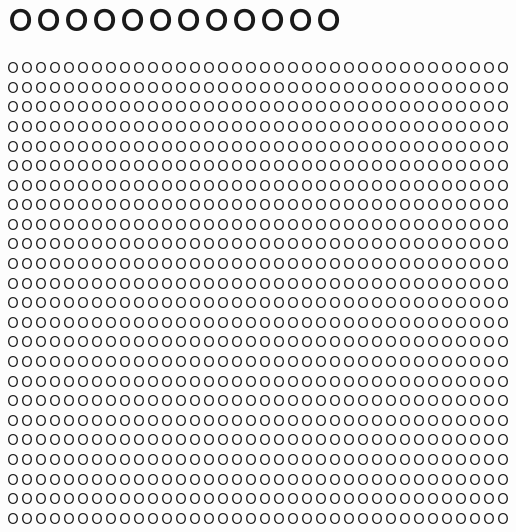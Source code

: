 \documentclass[10pt,twocolumn]{jarticle}
\begin{document}
\section{ＯＯＯＯＯＯＯＯＯＯＯＯ}
ＯＯＯＯＯＯＯＯＯＯＯＯＯＯＯＯＯＯＯＯＯＯＯＯＯＯＯＯＯＯＯＯＯＯＯＯＯＯＯＯＯＯＯＯＯＯＯＯＯＯＯＯＯＯＯＯＯＯＯＯＯＯＯＯＯＯＯＯＯＯＯＯＯＯＯＯＯＯＯＯＯＯＯＯＯＯＯＯＯＯＯＯＯＯＯＯＯＯＯＯＯＯＯＯＯＯＯＯＯＯＯＯＯＯＯＯＯＯＯＯＯＯＯＯＯＯＯＯＯＯＯＯＯＯＯＯＯＯＯＯＯＯＯＯＯＯＯＯＯＯＯＯＯＯＯＯＯＯＯＯＯＯＯＯＯＯＯＯＯＯＯＯＯＯＯＯＯＯＯＯＯＯＯＯＯＯＯＯＯＯＯＯＯＯＯＯＯＯＯＯＯＯＯＯＯＯＯＯＯＯＯＯＯＯＯＯＯＯＯＯＯＯＯＯＯＯＯＯＯＯＯＯＯＯＯＯＯＯＯＯＯＯＯＯＯＯＯＯＯＯＯＯＯＯＯＯＯＯＯＯＯＯＯＯＯＯＯＯＯＯＯＯＯＯＯＯＯＯＯＯＯＯＯＯＯＯＯＯＯＯＯＯＯＯＯＯＯＯＯＯＯＯＯＯＯＯＯＯＯＯＯＯＯＯＯＯＯＯＯＯＯＯＯＯＯＯＯＯＯＯＯＯＯＯＯＯＯＯＯＯＯＯＯＯＯＯＯＯＯＯＯＯＯＯＯＯＯＯＯＯＯＯＯＯＯＯＯＯＯＯＯＯＯＯＯＯＯＯＯＯＯＯＯＯＯＯＯＯＯＯＯＯＯＯＯＯＯＯＯＯＯＯＯＯＯＯＯＯＯＯＯＯＯＯＯＯＯＯＯＯＯＯＯＯＯＯＯＯＯＯＯＯＯＯＯＯＯＯＯＯＯＯＯＯＯＯＯＯＯＯＯＯＯＯＯＯＯＯＯＯＯＯＯＯＯＯＯＯＯＯＯＯＯＯＯＯＯＯＯＯＯＯＯＯＯＯＯＯＯＯＯＯＯＯＯＯＯＯＯＯＯＯＯＯＯＯＯＯＯＯＯＯＯＯＯＯＯＯＯＯＯＯＯＯＯＯＯＯＯＯＯＯＯＯＯＯＯＯＯＯＯＯＯＯＯＯＯＯＯＯＯＯＯＯＯＯＯＯＯＯＯＯＯＯＯＯＯＯＯＯＯＯＯＯＯＯＯＯＯＯＯＯＯＯＯＯＯＯＯＯＯＯＯＯＯＯＯＯＯＯＯＯＯＯＯＯＯＯＯＯＯＯＯＯＯＯＯＯＯＯＯＯＯＯＯＯＯＯＯＯＯＯＯＯＯＯＯＯＯＯＯＯＯＯＯＯＯＯＯＯＯＯＯＯＯＯＯＯＯＯＯＯＯＯＯＯＯＯＯＯＯＯＯＯＯＯＯＯＯＯＯＯＯＯＯＯＯＯＯＯＯＯＯＯＯＯＯＯＯＯＯＯＯＯＯＯＯＯＯＯＯＯＯＯＯＯＯＯＯＯＯＯＯＯＯＯＯＯＯＯＯＯＯＯＯＯＯＯＯＯＯＯＯＯＯＯＯＯＯＯＯＯＯＯＯＯＯＯＯＯＯＯＯＯＯＯＯＯＯＯＯＯＯＯＯＯＯＯＯＯＯＯＯＯＯＯＯＯＯＯＯＯＯＯＯＯＯＯＯＯＯＯＯＯＯＯＯＯＯＯＯＯＯＯＯＯＯＯＯＯＯＯＯＯＯＯＯＯＯＯＯＯＯＯＯＯＯＯＯＯＯＯＯＯＯＯＯＯＯＯＯＯＯＯＯＯＯＯＯＯＯＯＯＯ
\end{document}
